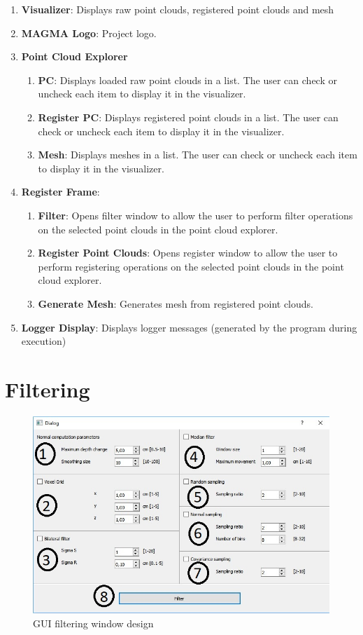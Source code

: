 \documentclass[aps,letterpaper,11pt]{revtex4}
\begin{document}
\begin{enumerate}
  \item \textbf{Visualizer}: Displays raw point clouds, registered point clouds and mesh
  \item\textbf{MAGMA Logo}: Project logo.
  \item \textbf{Point Cloud Explorer}
\begin{enumerate}
  \item \textbf{PC}:  Displays loaded raw point clouds in a list. The user can check or uncheck each item to display it in the visualizer.
 \item \textbf{Register PC}: Displays registered point clouds in a list. The user can check or uncheck each item to display it in the visualizer.
 \item \textbf{Mesh}: Displays meshes in a list. The user can check or uncheck each item to display it in the visualizer.
\end{enumerate}
 \item \textbf{Register Frame}:
\begin{enumerate}
  \item \textbf{Filter}: Opens filter window to allow the user to perform filter operations on the selected point clouds in the point cloud explorer.
 \item \textbf{Register Point Clouds}: Opens register window to allow the user to perform registering operations on the selected point clouds in the point cloud explorer.
 \item \textbf{Generate Mesh}: Generates mesh from registered point clouds.
\end{enumerate}
 \item \textbf{Logger Display}: Displays logger messages (generated by the program during execution)
\end{enumerate}



\section{Filtering}

\begin{figure}[H]
	\centering
	\includegraphics[width=15cm]{Gui_filter_1.jpg}
	\caption{GUI filtering window design}
	\label{fig: GlobalDesignNumbers}    
\end{figure}
\end{document}
